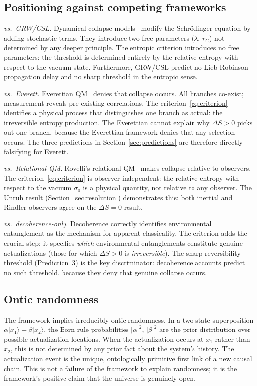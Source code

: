 \documentclass[11pt,twocolumn]{article}
\newcommand{\ket}[1]{|#1\rangle}
\begin{document}
\subsection{Positioning against competing frameworks}

\emph{vs.\ GRW/CSL.}
Dynamical collapse models~\cite{GRW1986,Pearle1989} modify the
Schr\"odinger equation by adding stochastic terms.
They introduce two free parameters ($\lambda$, $r_C$) not
determined by any deeper principle.
The entropic criterion introduces no free parameters: the
threshold is determined entirely by the relative entropy
with respect to the vacuum state.
Furthermore, GRW/CSL predict no Lieb-Robinson propagation delay
and no sharp threshold in the entropic sense.

\emph{vs.\ Everett.}
Everettian QM~\cite{Everett1957} denies that collapse occurs.
All branches co-exist; measurement reveals pre-existing
correlations.
The criterion~\eqref{eq:criterion} identifies a physical
process that distinguishes one branch as actual: the irreversible
entropy production.
The Everettian cannot explain why $\Delta S > 0$ picks out
one branch, because the Everettian framework denies that
any selection occurs.
The three predictions in Section~\ref{sec:predictions}
are therefore directly falsifying for Everett.

\emph{vs.\ Relational QM.}
Rovelli's relational QM~\cite{Rovelli1996} makes collapse
relative to observers.
The criterion~\eqref{eq:criterion} is observer-independent:
the relative entropy with respect to the vacuum $\sigma_0$
is a physical quantity, not relative to any observer.
The Unruh result (Section~\ref{sec:resolution}) demonstrates
this: both inertial and Rindler observers agree on the
$\Delta S = 0$ result.

\emph{vs.\ decoherence-only.}
Decoherence correctly identifies environmental entanglement
as the mechanism for apparent classicality.
The criterion adds the crucial step: it specifies
\emph{which} environmental entanglements constitute
genuine actualizations (those for which $\Delta S > 0$
is \emph{irreversible}).
The sharp reversibility threshold (Prediction~3) is the key
discriminator: decoherence accounts predict no such threshold,
because they deny that genuine collapse occurs.

\subsection{Ontic randomness}

The framework implies irreducibly ontic randomness.
In a two-state superposition $\alpha\ket{x_1} + \beta\ket{x_2}$,
the Born rule probabilities $|\alpha|^2$, $|\beta|^2$ are the
prior distribution over possible actualization locations.
When the actualization occurs at $x_1$ rather than $x_2$, this
is not determined by any prior fact about the system's history.
The actualization event is the unique, ontologically primitive
first link of a new causal chain.
This is not a failure of the framework to explain randomness; it
is the framework's positive claim that the universe is genuinely open.
\end{document}
